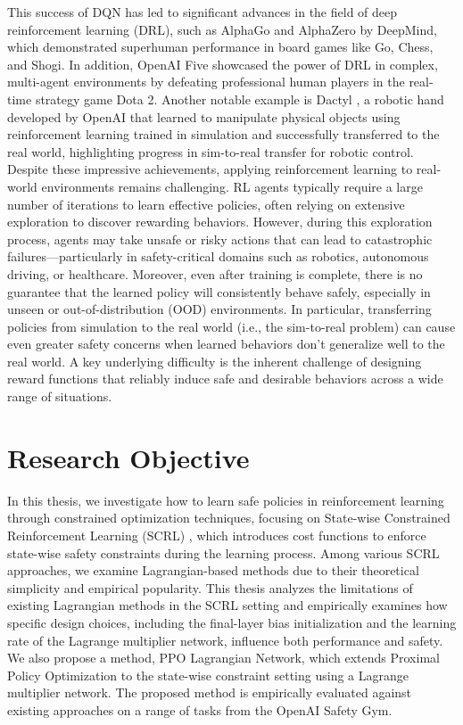 This success of DQN has led to significant advances in the field of deep reinforcement learning (DRL), such as AlphaGo \cite{AlphaGo} and AlphaZero \cite{AlphaZero} by DeepMind, which demonstrated superhuman performance in board games like Go, Chess, and Shogi.
In addition, OpenAI Five \cite{Five} showcased the power of DRL in complex, multi-agent environments by defeating professional human players in the real-time strategy game Dota 2.
Another notable example is Dactyl \cite{Dactyl}, a robotic hand developed by OpenAI that learned to manipulate physical objects using reinforcement learning trained in simulation and successfully transferred to the real world, highlighting progress in sim-to-real transfer for robotic control.
Despite these impressive achievements, applying reinforcement learning to real-world environments remains challenging.
RL agents typically require a large number of iterations to learn effective policies, often relying on extensive exploration to discover rewarding behaviors.
However, during this exploration process, agents may take unsafe or risky actions that can lead to catastrophic failures—particularly in safety-critical domains such as robotics, autonomous driving, or healthcare.
Moreover, even after training is complete, there is no guarantee that the learned policy will consistently behave safely, especially in unseen or out-of-distribution (OOD) environments.
In particular, transferring policies from simulation to the real world (i.e., the sim-to-real problem) can cause even greater safety concerns when learned behaviors don’t generalize well to the real world.
A key underlying difficulty is the inherent challenge of designing reward functions that reliably induce safe and desirable behaviors across a wide range of situations.

\section{Research Objective}

In this thesis, we investigate how to learn safe policies in reinforcement learning through constrained optimization techniques, focusing on State-wise Constrained Reinforcement Learning (SCRL) \cite{SCRL-survey}, which introduces cost functions to enforce state-wise safety constraints during the learning process.
Among various SCRL approaches, we examine Lagrangian-based methods due to their theoretical simplicity and empirical popularity.
This thesis analyzes the limitations of existing Lagrangian methods in the SCRL setting and empirically examines how specific design choices, including the final-layer bias initialization and the learning rate of the Lagrange multiplier network, influence both performance and safety.
We also propose a method, PPO Lagrangian Network, which extends Proximal Policy Optimization to the state-wise constraint setting using a Lagrange multiplier network.
The proposed method is empirically evaluated against existing approaches on a range of tasks from the OpenAI Safety Gym.


